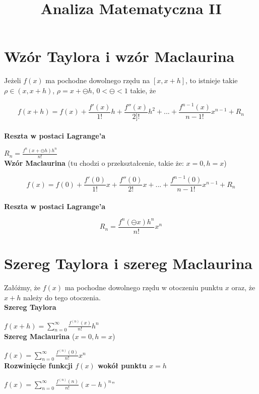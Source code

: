 \documentclass[10pt]{article}
\begin{document}
\title{Analiza Matematyczna II}
\maketitle
\section{Wzór Taylora i wzór Maclaurina}
    Jeżeli $f(x)$ ma pochodne dowolnego rzędu na $[x, x+h]$, 
    to istnieje takie $\rho \in (x, x+h)$, $\rho=x+\ominus h$, $0<\ominus<1$ takie, że \par
       $$f(x+h)=f(x)+\frac{f'(x)}{1!}h + \frac{f''(x)}{2]!}h^2 + ... + \frac{f^{n-1}(x)}{n-1!}x^{n-1}+R_n$$ \\
    \textbf{Reszta w postaci Lagrange'a} \par $R_n= \frac{f^n(x+\ominus h)h^n}{n!}$ \\
    \textbf{Wzór Maclaurina}
    (tu chodzi o przekształcenie, takie że: $x=0, h=x$) \par
    $$f(x)=f(0)+\frac{f'(0)}{1!}x+\frac{f''(0)}{2!}x+ ... + \frac{f^{n-1}(0)}{n-1!}x^{n-1}+R_n$$ \\
        \textbf{Reszta w postaci Lagrange'a} \par $$R_n= \frac{f^n(\ominus x)h^n}{n!}x^n$$
\section{Szereg Taylora i szereg Maclaurina}
    Załóżmy, że $f(x)$ ma pochodne dowolnego rzędu w otoczeniu punktu $x$ oraz, że $x+h$ należy do tego otoczenia. \\
     \textbf{Szereg Taylora} \par
    $f(x+h)=$$\sum_{n=0}^{\infty}$$\frac{f^{(n)}(x)}{n!}h^n $\\
    \textbf{Szereg Maclaurina}
    ($x=0, h=x$) \par
    $f(x)=$$\sum_{n=0}^{\infty}$$\frac{f^{(n)}(0)}{n!}x^n $ \\
    \textbf{Rozwinięcie funkcji $f(x)$ wokół punktu $x=h$} \par
    $f(x)=$$\sum_{n=0}^{\infty}$$\frac{f^{(n)}(n)}{n!}(x-h)^n $''
\end{document}
